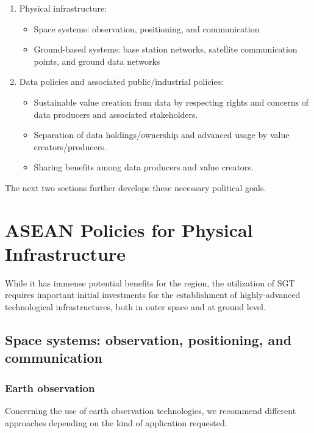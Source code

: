 \begin{enumerate}

\item Physical infrastructure:

\begin{itemize}
\item Space systems: observation, positioning, and communication
\item Ground-based systems: base station networks, satellite communication points, and ground data networks
\end{itemize}

\item Data policies and associated public/industrial policies:

\begin{itemize}
\item Sustainable value creation from data by respecting rights and concerns of data producers and associated stakeholders.
\item Separation of data holdings/ownership and advanced usage by value creators/producers.
\item Sharing benefits among data producers and value creators.
\end{itemize}

\end{enumerate}

The next two sections further develops these necessary political goals.


\section{ASEAN Policies for Physical Infrastructure} \label{infrastructure}

\tab While it has immense potential benefits for the region, the utilization of SGT requires important initial investments for the establishment of highly-advanced  technological infrastructures, both in outer space and at ground level.


\subsection{Space systems: observation, positioning, and communication}

\subsubsection{Earth observation}

\tab Concerning the use of earth observation technologies, we recommend different approaches depending on the kind of application requested.

